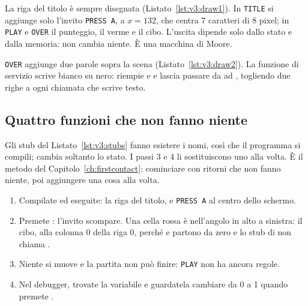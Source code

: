 La riga del titolo è sempre disegnata (Listato~\ref{lst:v3:draw1}). In
\texttt{TITLE} si aggiunge solo l'invito \texttt{PRESS A}, a $x=132$, che
centra 7 caratteri di 8 pixel; in \texttt{PLAY} e \texttt{OVER} il punteggio,
il verme e il cibo. L'uscita dipende solo dallo stato e dalla memoria:
 non cambia niente. È una macchina di Moore.


\texttt{OVER} aggiunge due parole sopra la scena
(Listato~\ref{lst:v3:draw2}). La funzione di servizio  scrive
bianco su nero: riempie  e  e lascia passare da  ad
, togliendo due righe a ogni chiamata che scrive testo.

\subsection{Quattro funzioni che non fanno niente}


Gli stub del Listato~\ref{lst:v3:stubs} fanno esistere i nomi, così che il
programma si compili;  cambia soltanto lo stato. I passi 3 e 4
li sostituiscono uno alla volta. È il metodo del
Capitolo~\ref{ch:firstcontact}: cominciare con ritorni che non fanno niente,
poi aggiungere una cosa alla volta.

\begin{prgcheck}
\begin{enumerate}[nosep]
\item Compilate ed eseguite: la riga del titolo, e \texttt{PRESS A} al centro
  dello schermo.
\item Premete : l'invito scompare. Una cella rossa è nell'angolo in alto
  a sinistra: il cibo, alla colonna 0 della riga 0, perché  e
   partono da zero e lo stub di  non chiama
  .
\item Niente si muove e la partita non può finire: \texttt{PLAY} non ha ancora
  regole.
\item Nel debugger, trovate la variabile  e guardatela cambiare da
  0 a 1 quando premete .
\end{enumerate}
\end{prgcheck}


